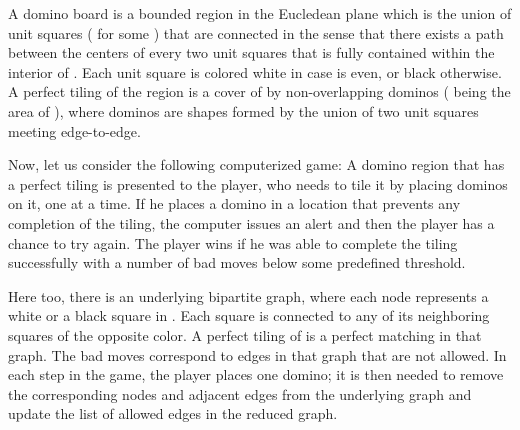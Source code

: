 \documentclass[times, 11pt]{article}
\begin{document}
A domino board is a bounded region  in the Eucledean plane which is the union of unit squares ( for some ) that are connected
in the sense that there exists a path between the centers of every two unit squares that is fully contained within the interior of .
Each unit square  is colored white in case  is even, or black otherwise.
A perfect tiling of the region  is a cover of 
by  non-overlapping dominos ( being the area of ), where dominos are shapes formed by the union of two unit squares meeting edge-to-edge.

Now, let us consider the following computerized game: A domino region that has a perfect tiling is presented to the player, who needs to tile it by placing
dominos on it, one at a time.
If he places
a domino in a location that prevents any completion of the tiling, the computer issues an alert and then the player has a chance to try again.
The player wins if he was able to complete the tiling successfully with a number of
bad moves below some predefined threshold.

Here too, there is an underlying bipartite graph, where each node represents a white or a black square in . Each square is connected to any of its neighboring
squares of the opposite color. A perfect tiling of  is a perfect matching in that graph.
The bad moves correspond to edges in that graph that are not allowed.
In each step in the game, the player places one domino; it is then
needed to remove the corresponding nodes and adjacent edges from the underlying graph and update the list of allowed edges in the reduced graph.
\end{document}
